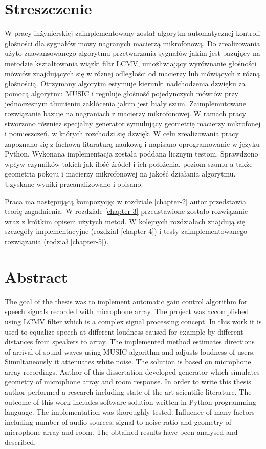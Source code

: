 \chapter*{Streszczenie}


W pracy inżynierskiej zaimplementowany został algorytm automatycznej kontroli głośności dla sygnałów mowy nagranych macierzą mikrofonową. Do zrealizowania użyto zaawansowanego algorytmu przetwarzania sygnałów jakim jest bazujący na metodzie kształtowania wiązki filtr LCMV, umożliwiający wyrównanie głośności mówców znajdujących się w różnej odległości od macierzy lub mówiących z różną głośnością. Otrzymany algorytm estymuje kierunki nadchodzenia dzwięku za pomocą algorytmu MUSIC i reguluje głośność pojedynczych mówców przy jednoczesnym tłumieniu zakłócenia jakim jest biały szum. Zaimplemntowane rozwiązanie bazuje na nagraniach z macierzy mikrofonowej. W ramach pracy stworzono również specjalny generator symulujący geometrię macierzy mikrofonej i pomieszczeń, w których rozchodzi się dzwięk. W celu zrealizowania pracy zapoznano się z fachową litaraturą naukową i napisano oprogramowanie w języku Python. Wykonana implementacja została poddana licznym testom. Sprawdzono wpływ czynników takich jak ilość źródeł i ich położenia, poziom szumu a także geometria pokoju i macierzy mikrofonowej na jakość działania algorytmu. Uzyskane wyniki przeanalizowano i opisano. 

Praca ma następującą kompozycję: w rozdziale \ref{chapter-2} autor przedstawia teorię zagadnienia. W rozdziale \ref{chapter-3} przedstawione zostało rozwiązanie wraz z krótkim opisem użytych metod. W kolejnych rozdziałach znajdują się szczegóły implementacyjne (rozdział \ref{chapter-4}) i testy zaimplementowanego rozwiązania (rodział \ref{chapter-5}).

\newpage

\chapter*{Abstract}

The goal of the thesis was to implement automatic gain control algorithm for speech signals recorded with microphone array. The project was accomplished using LCMV filter which is a complex signal processing concept. In this work it is used to equalize speech at different loudness caused for example by different distances from speakers to array. The implemented method estimates directions of arrival of sound waves using MUSIC algorithm and adjusts loudness of users. Simultaneously it attenuates white noise. The solution is based on microphone array recordings. Author of this dissertation developed generator which simulates geometry of microphone array and room response. In order to write this thesis author performed a research including state-of-the-art scientific literature. The outcome of this work includes software solution written in Python programming language. The implementation was thoroughly tested. Influence of many factors including number of audio sources, signal to noise ratio and geometry of microphone array and room. The obtained results have been analysed and described. 

